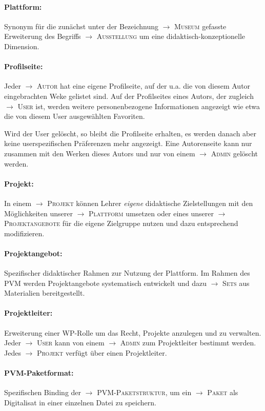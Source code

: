 \documentclass[a4paper,11pt]{article}
\newcommand{\glossar}[1]{{$\to$ \textsc{#1}}}
\begin{document}
\paragraph{Plattform:} 
Synonym für die zunächst unter der Bezeichnung \glossar{Museum} gefasste
Erweiterung des Begriffs \glossar{Ausstellung} um eine
didaktisch-konzeptionelle Dimension. 

\paragraph{Profilseite:} 
Jeder \glossar{Autor} hat eine eigene Profilseite, auf der u.a. die von diesem
Autor eingebrachten Weke gelistet sind.  Auf der Profilseites eines Autors,
der zugleich \glossar{User} ist, werden weitere personenbezogene Informationen
angezeigt wie etwa die von diesem User ausgewählten Favoriten. 

Wird der User gelöscht, so bleibt die Profilseite erhalten, es werden danach
aber keine userspezifischen Präferenzen mehr angezeigt.  Eine Autorenseite kann
nur zusammen mit den Werken dieses Autors und nur von einem \glossar{Admin}
gelöscht werden.

\paragraph{Projekt:} 
In einem \glossar{Projekt} können Lehrer \emph{eigene} didaktische
Zielstellungen mit den Möglichkeiten unserer \glossar{Plattform} umsetzen oder
eines unserer \glossar{Projektangebote} für die eigene Zielgruppe nutzen und
dazu entsprechend modifizieren.

\paragraph{Projektangebot:} 
Spezifischer didaktischer Rahmen zur Nutzung der Plattform. Im Rahmen des PVM
werden Projektangebote systematisch entwickelt und dazu \glossar{Sets} aus
Materialien bereitgestellt.

\paragraph{Projektleiter:} 
Erweiterung einer WP-Rolle um das Recht, Projekte anzulegen und zu verwalten.
Jeder \glossar{User} kann von einem \glossar{Admin} zum Projektleiter bestimmt
werden. Jedes \glossar{Projekt} verfügt über einen Projektleiter.

\paragraph{PVM-Paketformat:}
Spezifischen Binding der \glossar{PVM-Paketstruktur}, um ein \glossar{Paket}
als Digitalisat in einer einzelnen Datei zu speichern.
\end{document}
